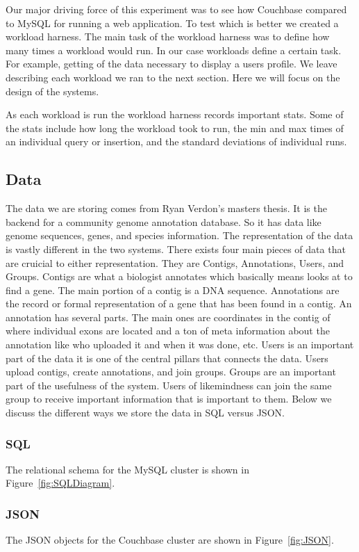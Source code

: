 \documentclass[]{IEEEtran}
\begin{document}
Our major driving force of this experiment was to see how Couchbase compared to MySQL for running a web application. To test which is better we created a workload harness. The main task of the workload harness was to define how many times a workload would run. In our case workloads define a certain task. For example, getting of the data necessary to display a users profile. We leave describing each workload we ran to the next section. Here we will focus on the design of the systems. 

As each workload is run the workload harness records important stats. Some of the stats include how long the workload took to run, the min and max times of an individual query or insertion, and the standard deviations of individual runs.

\subsection{Data}
The data we are storing comes from Ryan Verdon's masters thesis. It is the backend for a community genome annotation database. So it has data like genome sequences, genes, and species information. The representation of the data is vastly different in the two systems. There exists four main pieces of data that are cruicial to either representation. They are Contigs, Annotations, Users, and Groups. Contigs are what a biologist annotates which basically means looks at to find a gene. The main portion of a contig is a DNA sequence. Annotations are the record or formal representation of a gene that has been found in a contig. An annotation has several parts. The main ones are coordinates in the contig of where individual exons are located and a ton of meta information about the annotation like who uploaded it and when it was done, etc. Users is an important part of the data it is one of the central pillars that connects the data. Users upload contigs, create annotations, and join groups. Groups are an important part of the usefulness of the system. Users of likemindness can join the same group to receive important information that is important to them. Below we discuss the different ways we store the data in SQL versus JSON.

\subsubsection{SQL}
The relational schema for the MySQL cluster is shown in Figure~\ref{fig:SQLDiagram}.

\subsubsection{JSON}
The JSON objects for the Couchbase cluster are shown in Figure~\ref{fig:JSON}.
\end{document}

